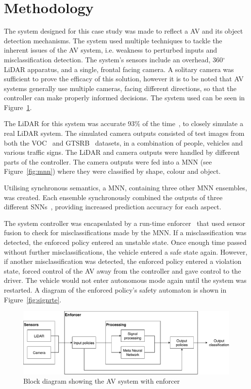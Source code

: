 \section{Methodology} 
The system designed for this case study was made to reflect a \acf{AV} and its object detection mechanisms. 
The system used multiple techniques to tackle the inherent issues of the \ac{AV} system, i.e. weakness to perturbed inputs and misclassification detection.
The system's sensors include an overhead, 360$^\circ$ \acf{LiDAR} apparatus, and a single, frontal facing camera.
A solitary camera was sufficient to prove the efficacy of this solution, however it is to be noted that \ac{AV} systems generally use multiple cameras, facing different directions, so that the controller can make properly informed decisions.
The system used can be seen in Figure~\ref{fig:ssnn}. 

The \ac{LiDAR} for this system was accurate 93\% of the time~\cite{lidarFusion}, to closely simulate a real \ac{LiDAR} system.
The simulated camera outputs consisted of test images from both the \ac{VOC}~\cite{pascal-voc-2012} and \ac{GTSRB}~\cite{Stallkamp2012-gtsrb} datasets, in a combination of people, vehicles and various traffic signs.
The \ac{LiDAR} and camera outputs were handled by different parts of the controller.
The camera outputs were fed into a \ac{MNN} (see Figure~\ref{fig:mnn}) where they were classified by shape, colour and object.

Utilising synchronous semantics, a \acf{MNN}, containing three other \ac{MNN} ensembles, was created.
Each ensemble synchronously combined the outputs of three different \acfp{SNN}~\cite{sann}, providing increased prediction accuracy for each aspect. 

The system controller was encapsulated by a run-time enforcer~\cite{recps} that used sensor fusion to check for misclassifications made by the \ac{MNN}.
If a misclassification was detected, the enforced policy entered an unstable state. 
Once enough time passed without further misclassifications, the vehicle entered a safe state again.
However, if another misclassification was detected, the enforced policy entered a violation state, forced control of the \ac{AV} away from the controller and gave control to the driver.
The vehicle would not enter autonomous mode again until the system was restarted.
A diagram of the enforced policy's safety automaton is shown in Figure~\ref{fig:signrte}.


\begin{figure}[t]
	\centering
	\includegraphics[scale=0.6]{Content/fig/SSNN.pdf}
	\caption{Block diagram showing the AV system with enforcer \label{fig:ssnn}}
\end{figure}

